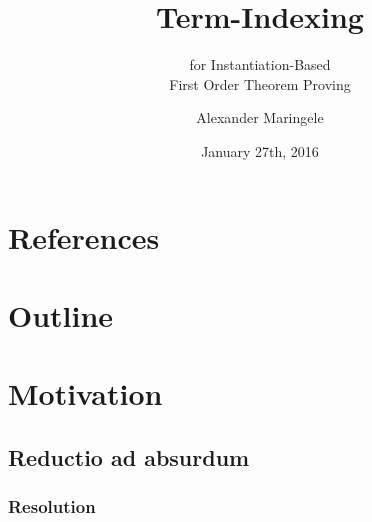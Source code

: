 \documentclass[ 
xcolor={usenames,dvipsnames,svgnames,tablem} 
,handout
]{beamer}
\author{Alexander Maringele}
\title{Term-Indexing
}
\subtitle{for Instantiation-Based\\First Order Theorem Proving}
\date{January 27th, 2016}
\begin{document}


\frame[<+->]{
\maketitle
}

\section*{References}


\section*{Outline}
\setcounter{tocdepth}{1}




%

\section{Motivation}

%

\subsection{Reductio ad absurdum}
%
%

\begin{frame}
\frametitle{Resolution}


\end{frame}
\end{document}
